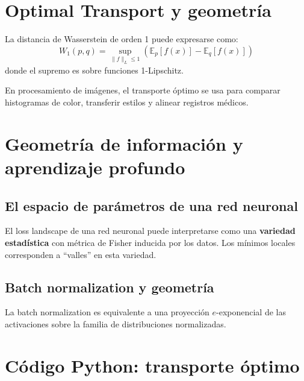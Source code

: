 \section{Optimal Transport y geometría}

\begin{theorem}
	La distancia de Wasserstein de orden 1 puede expresarse como:
	\[
	W_1(p, q) = \sup_{\|f\|_L \le 1} \left(\mathbb{E}_p[f(x)] - \mathbb{E}_q[f(x)]\right)
	\]
	donde el supremo es sobre funciones 1-Lipschitz.
\end{theorem}

\begin{example}
	En procesamiento de imágenes, el transporte óptimo se usa para comparar histogramas de color, transferir estilos y alinear registros médicos.
\end{example}

\section{Geometría de información y aprendizaje profundo}

\subsection{El espacio de parámetros de una red neuronal}

\begin{proposition}
	El loss landscape de una red neuronal puede interpretarse como una \textbf{variedad estadística} con métrica de Fisher inducida por los datos.  Los mínimos locales corresponden a ``valles'' en esta variedad.
\end{proposition}

\subsection{Batch normalization y geometría}

\begin{theorem}
	La batch normalization es equivalente a una proyección $e$-exponencial de las activaciones sobre la familia de distribuciones normalizadas.
\end{theorem}

\section{Código Python: transporte óptimo}

